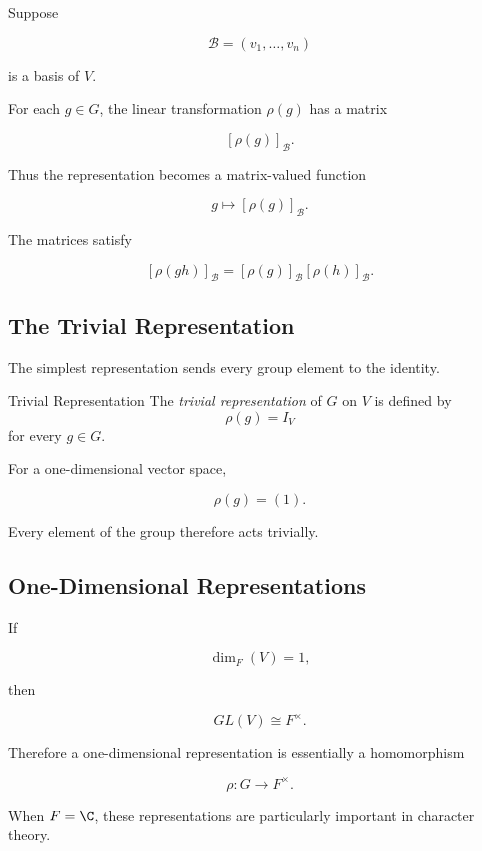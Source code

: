 Suppose

\[ \mathcal B=(v_1,\ldots,v_n) \]

is a basis of \(V\).

For each \(g\in G\), the linear transformation \(\rho(g)\) has a matrix

\[ [\rho(g)]_{\mathcal B}. \]

Thus the representation becomes a matrix-valued function

\[ g\longmapsto[\rho(g)]_{\mathcal B}. \]

The matrices satisfy

\[ [\rho(gh)]_{\mathcal B}=[\rho(g)]_{\mathcal B}[\rho(h)]_{\mathcal B}. \]

\subsection{The Trivial Representation}
\label{subsec:trivial-representation}

The simplest representation sends every group element to the identity.

\begin{definitionbox}{Trivial Representation}
The \emph{trivial representation} of \(G\) on \(V\) is defined by
\[ \rho(g)=I_V \]
for every \(g\in G\).
\end{definitionbox}

For a one-dimensional vector space,

\[ \rho(g)=(1). \]

Every element of the group therefore acts trivially.

\subsection{One-Dimensional Representations}
\label{subsec:one-dimensional-representations}

If

\[ \dim_F(V)=1, \]

then

\[ GL(V)\cong F^\times. \]

Therefore a one-dimensional representation is essentially a homomorphism

\[ \rho:G\to F^\times. \]

When \(F=\C\), these representations are particularly important in character
theory.

